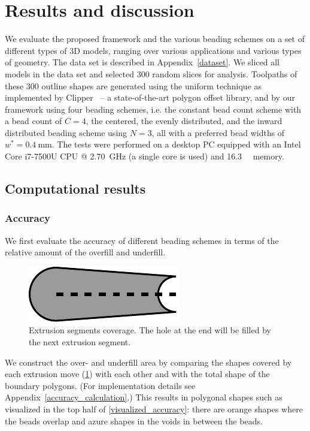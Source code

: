 \section{Results and discussion}

We evaluate the proposed framework and the various beading schemes on a set of different types of 3D models, ranging over various applications and various types of geometry. 
The data set is described in Appendix~\ref{dataset}.
We sliced all models in the data set and selected 300 random slices for analysis.
Toolpaths of these 300 outline shapes are generated using the uniform technique as implemented by Clipper~\cite{johnson2014clipper} -- a state-of-the-art polygon offset library, and by our framework using four beading schemes, i.e. the constant bead count scheme with a bead count of $C=4$, the centered, the evenly distributed, and the inward distributed beading scheme using $N=3$, all with a preferred bead widths of $w^* = \SI{0.4}{\milli\meter}$. The tests were performed on a desktop PC equipped with an Intel Core i7-7500U CPU @ \SI{2.70}{\giga\hertz} (a single core is used) and \SI{16.3}{\giga\byte} memory.





\subsection{Computational results}


\subsubsection{Accuracy}
We first evaluate the accuracy of different beading schemes in terms of the relative amount of the overfill and underfill. 
\begin{figure}
\centering
\includegraphics[width=.25\columnwidth]{sources-validation-visualization-principle-rounded-excluded-single.pdf}
\caption{
Extrusion segments coverage.
The hole at the end will be filled by the next extrusion segment.
}
\label{segment_visualization_simple}
\end{figure}
We construct the over- and underfill area by comparing the shapes covered by each extrusion move (\cref{segment_visualization_simple}) with each other and with the total shape of the boundary polygons. (For implementation details see Appendix~\ref{accuracy_calculation}.)
This results in polygonal shapes such as visualized in the top half of \cref{visualized_accuracy}:
there are orange shapes where the beads overlap and azure shapes in the voids in between the beads.


